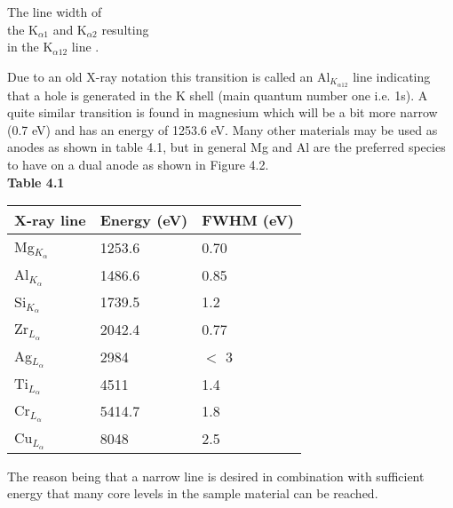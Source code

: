 \vspace{1cm}

    The  line width   of\\   the
  K$_{\alpha 1}$ and K$_{\alpha2}$ resulting\\ in the K$_{\alpha
 12}$ line \cite{siegbahn1}.\\

                                              \vspace{5cm}

             Due to an old X-ray notation this transition is called an
          Al$_{K_{\alpha 12}}$ line indicating that a hole is
          generated in the K shell (main quantum number one i.e. 1s).
          A quite similar transition is found in magnesium which will
          be a bit more narrow (0.7 eV) and has an energy of 1253.6
          eV. Many other materials may be used as anodes as shown in
          table 4.1, but in general Mg and Al are the preferred
          species to have on a dual anode as shown in Figure 4.2.\\


{\bf Table 4.1}\\


             \begin{tabular}{||l|l|l||} \hline
          X-ray line & Energy (eV) & FWHM (eV) \\ \hline
          Mg$_{K_{\alpha}}$ & 1253.6 & 0.70 \\ \hline
          Al$_{K_{\alpha}}$ & 1486.6 & 0.85 \\ \hline
          Si$_{K_{\alpha}}$ & 1739.5 & 1.2 \\ \hline
          Zr$_{L_{\alpha}}$ & 2042.4 & 0.77 \\ \hline
          Ag$_{L_{\alpha}}$ & 2984 & $<$ 3 \\ \hline
          Ti$_{L_{\alpha}}$ & 4511 & 1.4 \\ \hline
          Cr$_{L_{\alpha}}$ & 5414.7 & 1.8 \\ \hline
          Cu$_{L_{\alpha}}$ & 8048 & 2.5 \\ \hline
          \end{tabular}

                   \vspace{1cm}

             The reason being that a narrow line is desired in
          combination with sufficient energy that many core levels in
          the sample material can be reached.



